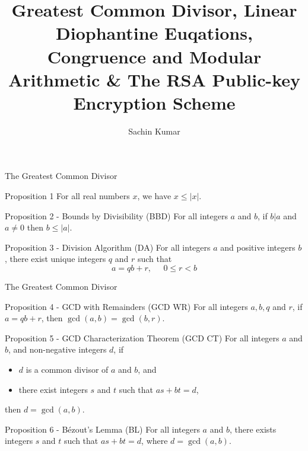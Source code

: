 \documentclass[11pt, aspectratio=169]{beamer}
\author{Sachin Kumar}
\title{Greatest Common Divisor, Linear Diophantine Euqations, Congruence and Modular Arithmetic \& The RSA Public-key Encryption Scheme}
\institute{University of Waterloo}
\begin{document}
\maketitle


\begin{frame}{The Greatest Common Divisor}

\begin{block}{Proposition 1}
For all real numbers $x$, we have $x \le |x|$.
\end{block}

\begin{block}{Proposition 2 - Bounds by Divisibility (BBD)}
For all integers $a$ and $b$, if $b | a$ and $a \ne 0$ then $b \le |a|$.
\end{block}

\begin{block}{Proposition 3 - Division Algorithm (DA)}
For all integers $a$ and positive integers $b$, there exist unique integers $q$ and $r$ such that $$a=qb + r, \; \; \; \; \; 0 \le r < b$$
\end{block}

\end{frame}





\begin{frame}{The Greatest Common Divisor}

\begin{block}{Proposition 4 - GCD with Remainders (GCD WR)}
For all integers $a, b, q$ and $r$, if $a = qb + r$, then $\gcd(a,b) = \gcd(b,r)$.
\end{block}

\begin{block}{Proposition 5 - GCD Characterization Theorem (GCD CT)}
For all integers $a$ and $b$, and non-negative integers $d$, if 
\begin{itemize}
    \item $d$ is a common divisor of $a$ and $b$, and
    \item there exist integers $s$ and $t$ such that $as + bt = d$,
\end{itemize}
then $d = \gcd(a,b)$.
\end{block}

\begin{block}{Proposition 6 - Bézout’s Lemma (BL)}
For all integers $a$ and $b$, there exists integers $s$ and $t$ such that $as + bt = d$, where $d = \gcd(a,b)$.
\end{block}

\end{frame}
\end{document}
